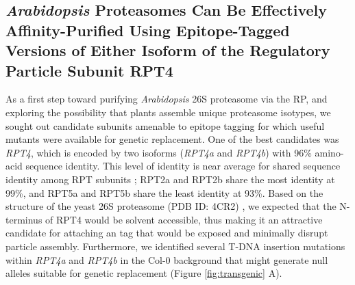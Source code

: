 \subsection{\textit{Arabidopsis} Proteasomes Can Be Effectively Affinity-Purified Using Epitope-Tagged Versions of Either Isoform of the Regulatory Particle Subunit RPT4}
As a first step toward purifying \textit{Arabidopsis} 26S proteasome via the RP, and exploring the possibility that plants assemble unique proteasome isotypes, we sought out candidate subunits amenable to epitope tagging for which useful mutants were available for genetic replacement.  One of the best candidates was \textit{RPT4}, which is encoded by two isoforms (\textit{RPT4a} and \textit{RPT4b}) with 96\% amino-acid sequence identity.  This level of identity is near average for shared sequence identity among RPT subunits \citep{book10}; RPT2a and RPT2b share the most identity at 99\%, and RPT5a and RPT5b share the least identity at 93\%. Based on the structure of the yeast 26S proteasome (PDB ID: 4CR2) \citep{beck12}, we expected that the N-terminus of RPT4 would be solvent accessible, thus making it an attractive candidate for attaching an tag that would be exposed and minimally disrupt particle assembly.  Furthermore, we identified several T-DNA insertion mutations within \textit{RPT4a} and \textit{RPT4b} in the Col-0 background that might generate null alleles suitable for genetic replacement (Figure \ref{fig:transgenic} A). 
